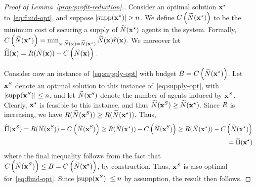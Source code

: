 \documentclass[12pt]{article}
\begin{document}
\begin{proof}[Proof of Lemma~\ref{prop:profit-reduction}.]
Consider an optimal solution $\mathbf{x}^\star$ to~\ref{eq:fluid-opt}, and suppose $|\text{supp}(\mathbf{x}^\star)| > n$. We define $C\left(\widetilde{N}(\mathbf{x}^\star)\right)$ to be the minimum cost of securing a supply of $\widetilde{N}(\mathbf{x}^\star)$ agents in the system. Formally, 
$C\left(\widetilde{N}(\mathbf{x}^\star)\right) = \min_{\mathbf{x}: \widetilde{N}(\mathbf{x}) = \widetilde{N}(\mathbf{x}^\star)} \widetilde{N}(\mathbf{x})\widehat{r}(\mathbf{x}).$
We moreover let $\widehat{\Pi}(\mathbf{x}) = R(\widetilde{N}(\mathbf{x})) - C\left(\widetilde{N}(\mathbf{x})\right).$

Consider now an instance of~\ref{eq:supply-opt} with budget $B = C\left(\widetilde{N}(\mathbf{x}^\star)\right)$. Let $\mathbf{x}^S$ denote an optimal solution to this instance of~\ref{eq:supply-opt}, with $|\text{supp}(\mathbf{x}^S)| \leq n$, and let $\widetilde{N}(\mathbf{x}^S)$ denote the number of agents induced by $\mathbf{x}^S$. %
Clearly, $\mathbf{x}^\star$ is feasible to this instance, and thus $\widetilde{N}(\mathbf{x}^S)\geq\widetilde{N}(\mathbf{x}^\star)$. Since $R$ is increasing, we have $R(\widetilde{N}(\mathbf{x}^S)) \geq R(\widetilde{N}(\mathbf{x}^\star))$. Thus,
\begin{align*}
    \widehat{\Pi}(\mathbf{x}^S) = R(\widetilde{N}(\mathbf{x}^S)) - C\left(\widetilde{N}(\mathbf{x}^S)\right) \geq R(\widetilde{N}(\mathbf{x}^\star))-C\left(\widetilde{N}(\mathbf{x}^S)\right) \geq R(\widetilde{N}(\mathbf{x}^\star))-C\left(\widetilde{N}(\mathbf{x}^\star)\right)\\ = \widehat{\Pi}(\mathbf{x}^\star)
\end{align*}
where the final inequality follows from the fact that $C\left(\widetilde{N}(\mathbf{x}^S)\right) \leq B = C\left(\widetilde{N}(\mathbf{x}^\star)\right)$, by construction. Thus, $\mathbf{x}^S$ is also optimal for~\ref{eq:fluid-opt}. Since $|\text{supp}(\mathbf{x}^S)| \leq n$ by assumption, the result then follows.
\end{proof}





\end{document}
